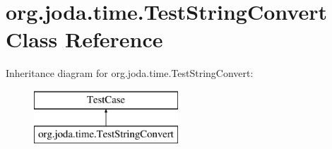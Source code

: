 \hypertarget{classorg_1_1joda_1_1time_1_1_test_string_convert}{\section{org.\-joda.\-time.\-Test\-String\-Convert Class Reference}
\label{classorg_1_1joda_1_1time_1_1_test_string_convert}
}
Inheritance diagram for org.\-joda.\-time.\-Test\-String\-Convert\-:\begin{figure}[H]
\begin{center}
\leavevmode
\includegraphics[height=2.000000cm]{classorg_1_1joda_1_1time_1_1_test_string_convert}
\end{center}
\end{figure}
